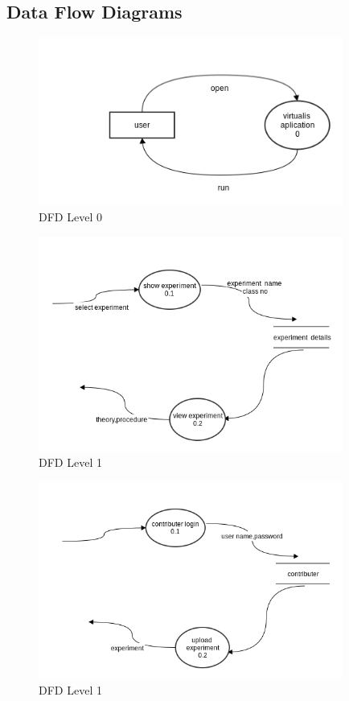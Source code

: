 \documentclass[12pt]{report}
\begin{document}
\subsection{Data Flow Diagrams}

\begin{figure}[H]
 \centering
 \includegraphics[width=10cm]{./dfd_level0.png}
 \caption{DFD Level 0\label{fig:dfd_level0}}
\end{figure}

\begin{figure}[H]
 \centering
 \includegraphics[width=10cm]{./dfd_level1_image1.png}
 \caption{DFD Level 1\label{fig:dfd_level1_image1}}
\end{figure}

\begin{figure}[H]
 \centering
 \includegraphics[width=10cm]{./dfd_level1_image2.png}
 \caption{DFD Level 1\label{fig:dfd_level1_image2}}
\end{figure}
\end{document}
